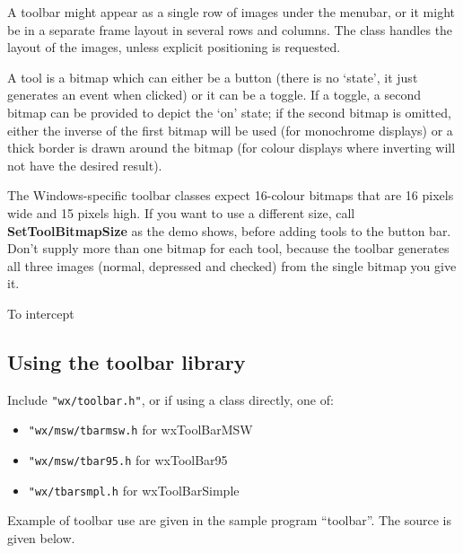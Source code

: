 A toolbar might appear as a single row of images under
the menubar, or it might be in a separate frame layout in several rows
and columns. The class handles the layout of the images, unless explicit
positioning is requested.

A tool is a bitmap which can either be a button (there is no `state',
it just generates an event when clicked) or it can be a toggle. If a
toggle, a second bitmap can be provided to depict the `on' state; if
the second bitmap is omitted, either the inverse of the first bitmap
will be used (for monochrome displays) or a thick border is drawn
around the bitmap (for colour displays where inverting will not have
the desired result).

The Windows-specific toolbar classes expect 16-colour bitmaps that are 16 pixels wide and 15 pixels
high. If you want to use a different size, call {\bf SetToolBitmapSize}\rtfsp
as the demo shows, before adding tools to the button bar. Don't supply more than
one bitmap for each tool, because the toolbar generates all three images (normal,
depressed and checked) from the single bitmap you give it.

To intercept

\subsection{Using the toolbar library}

Include {\tt "wx/toolbar.h"}, or if using a class directly, one of:

\begin{itemize}\itemsep=0pt
\item {\tt "wx/msw/tbarmsw.h} for wxToolBarMSW
\item {\tt "wx/msw/tbar95.h} for wxToolBar95
\item {\tt "wx/tbarsmpl.h} for wxToolBarSimple
\end{itemize}

Example of toolbar use are given in the sample program ``toolbar''. The
source is given below.

